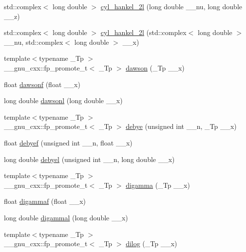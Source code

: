 \begin{DoxyCompactItemize}
\item 
std\+::complex$<$ long double $>$ \hyperlink{group__mathsf__gnu_ga4babb91ca6906f237e8bd1f0f1a10509}{cyl\+\_\+hankel\+\_\+2l} (long double \+\_\+\+\_\+nu, long double \+\_\+\+\_\+z)
\item 
std\+::complex$<$ long double $>$ \hyperlink{group__mathsf__gnu_ga1ac6434925254bd02e108f5a4e52b34d}{cyl\+\_\+hankel\+\_\+2l} (std\+::complex$<$ long double $>$ \+\_\+\+\_\+nu, std\+::complex$<$ long double $>$ \+\_\+\+\_\+x)
\item 
{\footnotesize template$<$typename \+\_\+\+Tp $>$ }\\\+\_\+\+\_\+gnu\+\_\+cxx\+::fp\+\_\+promote\+\_\+t$<$ \+\_\+\+Tp $>$ \hyperlink{group__mathsf__gnu_gabc97cbc04fdd23593e8dccbc1421dad5}{dawson} (\+\_\+\+Tp \+\_\+\+\_\+x)
\item 
float \hyperlink{group__mathsf__gnu_ga0a1b8e6760b8c7869127d41d96209318}{dawsonf} (float \+\_\+\+\_\+x)
\item 
long double \hyperlink{group__mathsf__gnu_ga6647a7444ff9c7c1f2a8ed36761bfeb2}{dawsonl} (long double \+\_\+\+\_\+x)
\item 
{\footnotesize template$<$typename \+\_\+\+Tp $>$ }\\\+\_\+\+\_\+gnu\+\_\+cxx\+::fp\+\_\+promote\+\_\+t$<$ \+\_\+\+Tp $>$ \hyperlink{group__mathsf__gnu_ga0b14de47c011de3ebf771c9f29b2b78c}{debye} (unsigned int \+\_\+\+\_\+n, \+\_\+\+Tp \+\_\+\+\_\+x)
\item 
float \hyperlink{group__mathsf__gnu_ga683d3a885913b52db128aa5d624984a4}{debyef} (unsigned int \+\_\+\+\_\+n, float \+\_\+\+\_\+x)
\item 
long double \hyperlink{group__mathsf__gnu_ga2db11e767b89bbd36be6ebfadda3401f}{debyel} (unsigned int \+\_\+\+\_\+n, long double \+\_\+\+\_\+x)
\item 
{\footnotesize template$<$typename \+\_\+\+Tp $>$ }\\\+\_\+\+\_\+gnu\+\_\+cxx\+::fp\+\_\+promote\+\_\+t$<$ \+\_\+\+Tp $>$ \hyperlink{group__mathsf__gnu_ga7b87300edf8754d959e1d94fe0c9246e}{digamma} (\+\_\+\+Tp \+\_\+\+\_\+x)
\item 
float \hyperlink{group__mathsf__gnu_ga65b58ffe1d02ccda1113539b62d87b94}{digammaf} (float \+\_\+\+\_\+x)
\item 
long double \hyperlink{group__mathsf__gnu_gaaa1bf1503709175915cb81bcd4355ccf}{digammal} (long double \+\_\+\+\_\+x)
\item 
{\footnotesize template$<$typename \+\_\+\+Tp $>$ }\\\+\_\+\+\_\+gnu\+\_\+cxx\+::fp\+\_\+promote\+\_\+t$<$ \+\_\+\+Tp $>$ \hyperlink{group__mathsf__gnu_ga4185ee1a0f9189a18085f65d52b6bc9b}{dilog} (\+\_\+\+Tp \+\_\+\+\_\+x)

\end{DoxyCompactItemize}
